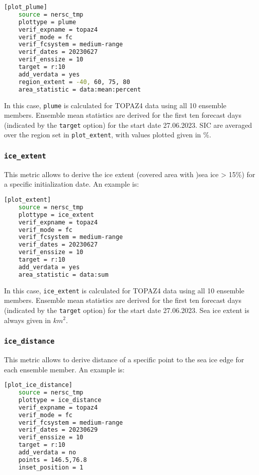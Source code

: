\documentclass[DIV=10, parskip=full]{scrreprt}
\begin{document}
\begin{lstlisting}[language=bash]
	[plot_plume]
	source = nersc_tmp   
	plottype = plume 
	verif_expname = topaz4 
	verif_mode = fc
	verif_fcsystem = medium-range
	verif_dates = 20230627
	verif_enssize = 10
	target = r:10
	add_verdata = yes
	region_extent = -40, 60, 75, 80
	area_statistic = data:mean:percent
\end{lstlisting}

In this case, \texttt{plume} is calculated for TOPAZ4 data using all 10 ensemble members. Ensemble mean statistics are derived for the first ten forecast days (indicated by the \texttt{target} option) for the start date 27.06.2023. SIC are averaged over the region set in \texttt{plot\_extent}, with values plotted given in \%.

\subsubsection{\texttt{ice\_extent}}
This metric allows to derive the ice extent (covered area with )sea ice > 15\%) for a specific initialization date. An example is:

\begin{lstlisting}[language=bash]
	[plot_extent]
	source = nersc_tmp   
	plottype = ice_extent 
	verif_expname = topaz4 
	verif_mode = fc
	verif_fcsystem = medium-range
	verif_dates = 20230627
	verif_enssize = 10
	target = r:10
	add_verdata = yes
	area_statistic = data:sum
\end{lstlisting}

In this case, \texttt{ice\_extent} is calculated for TOPAZ4 data using all 10 ensemble members. Ensemble mean statistics are derived for the first ten forecast days (indicated by the \texttt{target} option) for the start date 27.06.2023. Sea ice extent is always given in $km^2$.

\subsubsection{\texttt{ice\_distance}}
This metric allows to derive distance of a specific point to the sea ice edge for each ensemble member. An example is:

\begin{lstlisting}[language=bash]
	[plot_ice_distance]
	source = nersc_tmp
	plottype = ice_distance
	verif_expname = topaz4
	verif_mode = fc
	verif_fcsystem = medium-range
	verif_dates = 20230629
	verif_enssize = 10
	target = r:10
	add_verdata = no
	points = 146.5,76.8
	inset_position = 1
\end{lstlisting}
\end{document}
